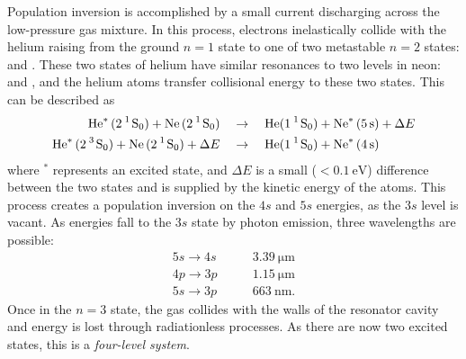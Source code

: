 \documentclass{homework}
\begin{document}
	Population inversion is accomplished by a small current discharging across the low-pressure gas mixture. In this process, electrons inelastically collide with the helium raising from the ground $n=1$ state to one of two metastable $n=2$ states:  and . These two states of helium have similar resonances to two levels in neon:  and , and the helium atoms transfer collisional energy to these two states. This can be described as
	\begin{align*}
		\ce{He^* (2^1 S_0)} + \ce{Ne (2^1 S_0)} & \quad \to \quad \ce{He(1^1 S_0)} +  \ce{Ne^* (5s)} + \Delta E \\
		\ce{He^* (2^3 S_0)} + \ce{Ne (2^1 S_0)} + \Delta E & \quad \to \quad  \ce{He(1^1 S_0)} +  \ce{Ne^* (4s)} 
	\end{align*}
	where $^*$ represents an excited state, and $\Delta E$ is a small ($<\SI{0.1}{\eV}$) difference between the two states and is supplied by the kinetic energy of the atoms. This process creates a population inversion on the $4s$ and $5s$ energies, as the $3s$ level is vacant. As energies fall to the $3s$ state by photon emission, three wavelengths are possible: \begin{align*}
		5s \to 4s & \qquad \SI{3.39}{\um} \\
		4p \to 3p & \qquad \SI{1.15}{\um} \\
		5s \to 3p & \qquad \SI{663}{\nm}.
	\end{align*}
	Once in the $n=3$ state, the gas collides with the walls of the resonator cavity and energy is lost through radiationless processes. As there are now two excited states, this is a \textit{four-level system}.
	
	
	\pagebreak
	
\end{document}
